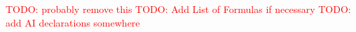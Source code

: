 \documentclass[12pt, a4paper, oneside]{book}   	%
\renewcommand{\todo}[1]{\textcolor{red}{TODO: #1}}
\begin{document}
	\todo{probably remove this}
	\todo{Add List of Formulas if necessary}
	\todo{add \gls{AI} declarations somewhere}
	
	
	\chapter{\bibname}
		\printbibliography[heading=none]
		
		
\end{document}
